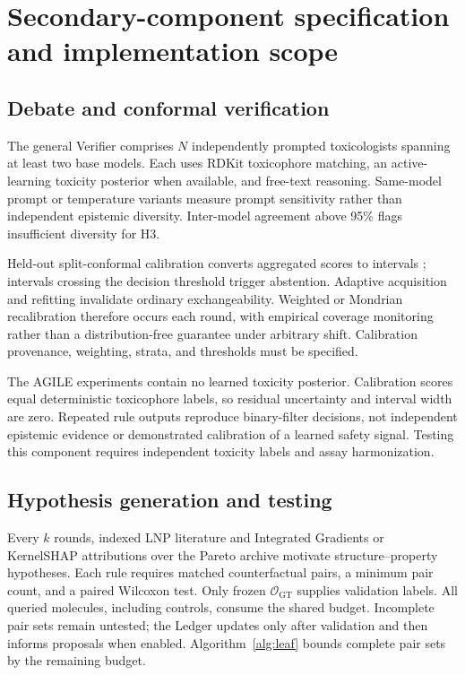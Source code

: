 \section{Secondary-component specification and implementation scope}
\label{app:agents}
\subsection{Debate and conformal verification}
The general Verifier comprises $N$ independently prompted toxicologists spanning at least two base models. Each uses RDKit toxicophore matching, an active-learning toxicity posterior when available, and free-text reasoning. Same-model prompt or temperature variants measure prompt sensitivity rather than independent epistemic diversity. Inter-model agreement above 95\% flags insufficient diversity for H3.

Held-out split-conformal calibration converts aggregated scores to intervals \citep{angelopoulos2023}; intervals crossing the decision threshold trigger abstention. Adaptive acquisition and refitting invalidate ordinary exchangeability. Weighted or Mondrian recalibration therefore occurs each round, with empirical coverage monitoring rather than a distribution-free guarantee under arbitrary shift. Calibration provenance, weighting, strata, and thresholds must be specified.

The AGILE experiments contain no learned toxicity posterior. Calibration scores equal deterministic toxicophore labels, so residual uncertainty and interval width are zero. Repeated rule outputs reproduce binary-filter decisions, not independent epistemic evidence or demonstrated calibration of a learned safety signal. Testing this component requires independent toxicity labels and assay harmonization.

\subsection{Hypothesis generation and testing}
Every $k$ rounds, indexed LNP literature and Integrated Gradients or KernelSHAP attributions over the Pareto archive motivate structure--property hypotheses. Each rule requires matched counterfactual pairs, a minimum pair count, and a paired Wilcoxon test. Only frozen $\mathcal O_{\mathrm{GT}}$ supplies validation labels. All queried molecules, including controls, consume the shared budget. Incomplete pair sets remain untested; the Ledger updates only after validation and then informs proposals when enabled. Algorithm~\ref{alg:leaf} bounds complete pair sets by the remaining budget.

